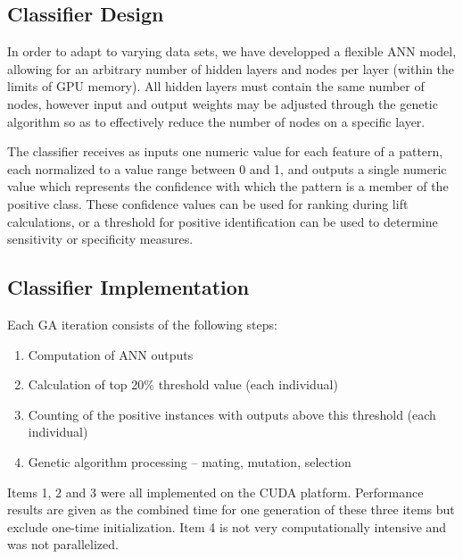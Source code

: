 \documentclass[11pt]{article}       %
\begin{document}
\subsection{Classifier Design} \label{design}
In order to adapt to varying data sets, we have developped a flexible ANN model, allowing for an arbitrary number of hidden layers and nodes per layer (within the limits of GPU memory). All hidden layers must contain the same number of nodes, however input and output weights may be adjusted through the genetic algorithm so as to effectively reduce the number of nodes on a specific layer.

The classifier receives as inputs one numeric value for each feature of a pattern, each normalized to a value range between 0 and 1, and outputs a single numeric value which represents the confidence with which the pattern is a member of the positive class.  These confidence values can be used for ranking during lift calculations, or a threshold for positive identification can be used to determine sensitivity or specificity measures.

\subsection{Classifier Implementation} \label{implementation}
Each GA iteration consists of the following steps:
\begin{enumerate}
	\item Computation of ANN outputs
	\item Calculation of top 20\% threshold value (each individual)
	\item Counting of the positive instances with outputs above this threshold (each individual)
	\item Genetic algorithm processing -- mating, mutation, selection
\end{enumerate}

Items 1, 2 and 3 were all implemented on the CUDA platform. Performance results are given as the combined time for one generation of these three items but exclude one-time initialization. Item 4 is not very computationally intensive and was not parallelized. 

\end{document}
